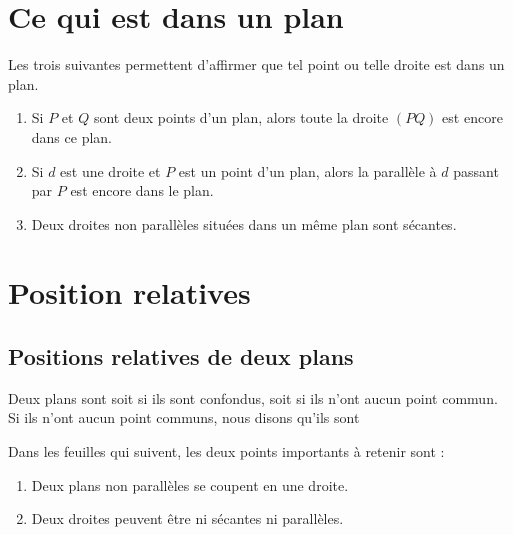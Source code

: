 \section{Ce qui est dans un plan}

Les trois suivantes permettent d'affirmer que tel point ou telle droite est dans un plan.
\begin{enumerate}
    \item
        Si \( P\) et \( Q\) sont deux points d'un plan, alors toute la droite \( (PQ)\) est encore dans ce plan.
    \item
        Si \( d\) est une droite et \( P\) est un point d'un plan, alors la parallèle à \( d\) passant par \( P\) est encore dans le plan.
    \item
        Deux droites non parallèles situées dans un même plan sont sécantes.
\end{enumerate}

\section{Position relatives}

\subsection{Positions relatives de deux plans}

\begin{definition}
    Deux plans sont  soit si ils sont confondus, soit si ils n'ont aucun point commun. Si ils n'ont aucun point communs, nous disons qu'ils sont 
\end{definition}

\begin{Aretenir}
    Dans les feuilles qui suivent, les deux points importants à retenir sont :
    \begin{enumerate}
        \item
            Deux plans non parallèles se coupent en une droite.
        \item
            Deux droites peuvent être ni sécantes ni parallèles.
    \end{enumerate}
\end{Aretenir}

